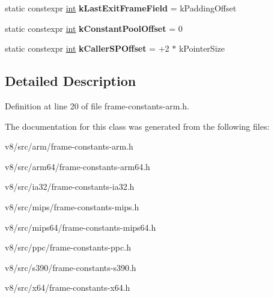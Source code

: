 \begin{DoxyCompactItemize}
static constexpr \mbox{\hyperlink{classint}{int}} {\bfseries k\+Last\+Exit\+Frame\+Field} = k\+Padding\+Offset
\item 
\mbox{\label{classv8_1_1internal_1_1ExitFrameConstants_af0330b75ee365ec9712cfb7d4e3d86b3}} 
static constexpr \mbox{\hyperlink{classint}{int}} {\bfseries k\+Constant\+Pool\+Offset} = 0
\item 
\mbox{\label{classv8_1_1internal_1_1ExitFrameConstants_a1f076e37bf4d97a2a187845d4b576ba1}} 
static constexpr \mbox{\hyperlink{classint}{int}} {\bfseries k\+Caller\+S\+P\+Offset} = +2 $\ast$ k\+Pointer\+Size
\end{DoxyCompactItemize}


\subsection{Detailed Description}


Definition at line 20 of file frame-\/constants-\/arm.\+h.



The documentation for this class was generated from the following files\+:\begin{DoxyCompactItemize}
\item 
v8/src/arm/frame-\/constants-\/arm.\+h\item 
v8/src/arm64/frame-\/constants-\/arm64.\+h\item 
v8/src/ia32/frame-\/constants-\/ia32.\+h\item 
v8/src/mips/frame-\/constants-\/mips.\+h\item 
v8/src/mips64/frame-\/constants-\/mips64.\+h\item 
v8/src/ppc/frame-\/constants-\/ppc.\+h\item 
v8/src/s390/frame-\/constants-\/s390.\+h\item 
v8/src/x64/frame-\/constants-\/x64.\+h\end{DoxyCompactItemize}
